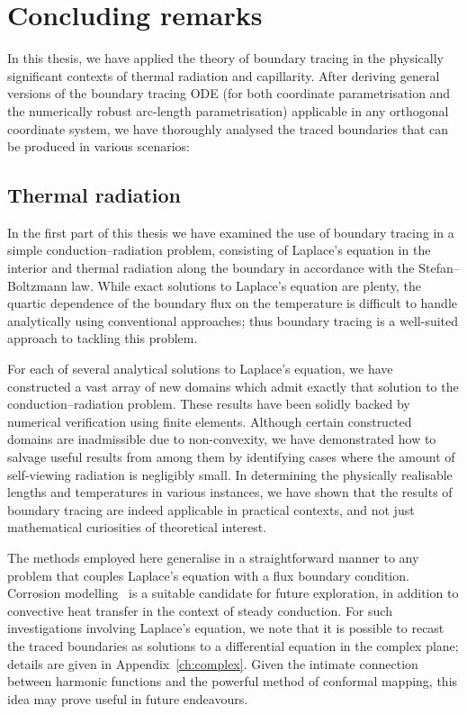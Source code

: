 \chapter{Concluding remarks}
\label{ch:concluding}

In this thesis,
we have applied the theory of boundary tracing
in the physically significant contexts
of thermal radiation and capillarity.
After deriving general versions of the boundary tracing ODE
(for both coordinate parametrisation
and the numerically robust arc-length parametrisation)
applicable in any orthogonal coordinate system,
we have thoroughly analysed
the traced boundaries that can be produced in various scenarios:

\section{Thermal radiation}
\label{sec:concluding.radiation}

In the first part of this thesis we have examined the use of boundary tracing
in a simple conduction--radiation problem,
consisting of Laplace's equation in the interior
and thermal radiation along the boundary
in accordance with the Stefan--Boltzmann law.
While exact solutions to Laplace's equation are plenty,
the quartic dependence of the boundary flux on the temperature
is difficult to handle analytically using conventional approaches;
thus boundary tracing is a well-suited approach to tackling this problem.

For each of several analytical solutions to Laplace's equation,
we have constructed a vast array of new domains
which admit exactly that solution
to the conduction--radiation problem.
These results have been solidly backed
by numerical verification using finite elements.
Although certain constructed domains are inadmissible
due to non-convexity,
we have demonstrated how to salvage useful results from among them
by identifying cases
where the amount of self-viewing radiation is negligibly small.
In determining the physically realisable lengths and temperatures
in various instances,
we have shown that the results of boundary tracing
are indeed applicable in practical contexts,
and not just mathematical curiosities of theoretical interest.

The methods employed here
generalise in a straightforward manner
to any problem
that couples Laplace's equation with a flux boundary condition.
Corrosion modelling~\cite{
  bryan-2002-singular-nonlinear-elliptic-corrosion,
  vogelius-1998-nonlinear-elliptic-bvp-corrosion
}
is a suitable candidate for future exploration,
in addition to convective heat transfer
in the context of steady conduction.
For such investigations involving Laplace's equation,
we note that it is possible to recast the traced boundaries
as solutions to a differential equation in the complex plane;
details are given in Appendix~\ref{ch:complex}\@.
Given the intimate connection between
harmonic functions and the powerful method of conformal mapping,
this idea may prove useful in future endeavours.

